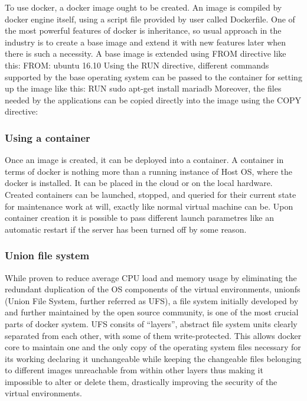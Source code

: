 To use docker, a docker image ought to be created. An image is compiled by docker engine itself, using a script file provided by user called Dockerfile. One of the most powerful features of docker is inheritance, so usual approach in the industry is to create a base image and extend it with new features later when there is such a necessity.
A base image is extended using FROM directive like this:
FROM: ubuntu 16.10
Using the RUN directive, different commands supported by the base operating system can be passed to the container for setting up the image like this:
RUN sudo apt-get install mariadb
Moreover, the files needed by the applications can be copied directly into the image using the COPY directive:

\subsubsection{Using a container}

Once an image is created, it can be deployed into a container. A
container in terms of docker is nothing more than a running
instance of Host OS, where the docker is installed. It can be placed
in the cloud or on the local hardware.
Created containers can be launched, stopped, and queried for their
current state for maintenance work at will, exactly like normal virtual
machine can be. Upon container creation it is possible to pass
different launch parametres like an automatic restart if the server
has been turned off by some reason.

\subsubsection{Union file system}

While proven to reduce average CPU load and memory usage by
eliminating the redundant duplication of the OS components of the
virtual environments,
unionfs (Union File System, further referred as UFS), a file system
initially developed by and further maintained by the open source
community, is one of the most crucial parts of docker system.
UFS consits of “layers”, abstract file system units clearly separated
from each other, with some of them write-protected. This allows
docker core to maintain one and the only copy of the operating
system files necessary for its working declaring it unchangeable
while keeping the changeable files belonging to different images
unreachable from within other layers thus making it impossible to
alter or delete them, drastically improving the security of the virtual
environments.

